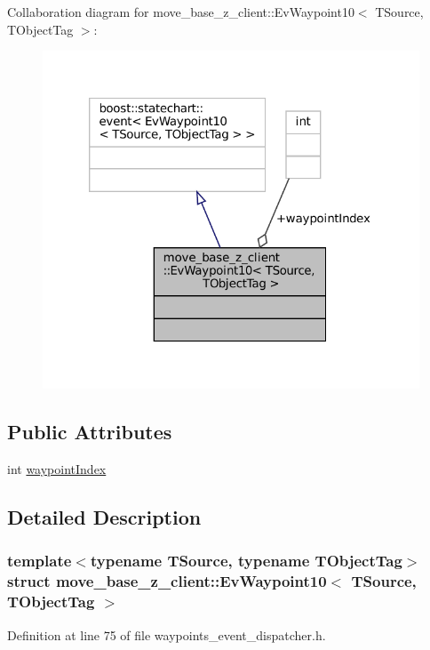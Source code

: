 Collaboration diagram for move\+\_\+base\+\_\+z\+\_\+client\+:\+:Ev\+Waypoint10$<$ T\+Source, T\+Object\+Tag $>$\+:
\nopagebreak
\begin{figure}[H]
\begin{center}
\leavevmode
\includegraphics[width=320pt]{structmove__base__z__client_1_1EvWaypoint10__coll__graph}
\end{center}
\end{figure}
\subsection*{Public Attributes}
\begin{DoxyCompactItemize}
\item 
int \hyperlink{structmove__base__z__client_1_1EvWaypoint10_a92230b8695f3cfe773cd79fbe81ae294}{waypoint\+Index}
\end{DoxyCompactItemize}


\subsection{Detailed Description}
\subsubsection*{template$<$typename T\+Source, typename T\+Object\+Tag$>$\newline
struct move\+\_\+base\+\_\+z\+\_\+client\+::\+Ev\+Waypoint10$<$ T\+Source, T\+Object\+Tag $>$}



Definition at line 75 of file waypoints\+\_\+event\+\_\+dispatcher.\+h.



